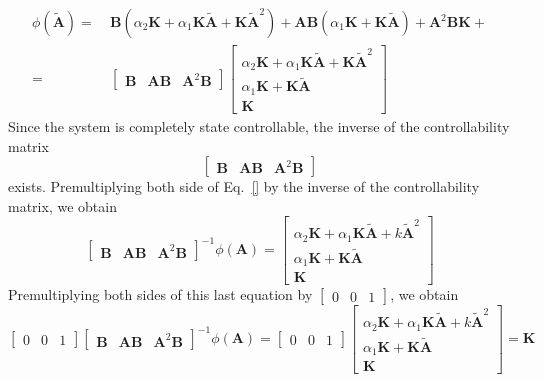 \documentclass[11pt,a4paper,oneside]{book}
\numberwithin{equation}{section}
\theoremstyle{it}
\theoremstyle{definition}
\begin{document}
\begin{equation} \label{ackermann_6}
	\begin{split}
		\phi(\tilde{\mathbf{A}}) = & \:\mathbf{B}(\alpha_2\mathbf{K}+\alpha_1\mathbf{K}\tilde{\mathbf{A}}+\mathbf{K}\tilde{\mathbf{A}}^2)+\mathbf{AB}(\alpha_1\mathbf{K}+\mathbf{K}\tilde{\mathbf{A}})+\mathbf{A}^2\mathbf{BK}+\\
		= & \: 	
		\begin{bmatrix}
			\mathbf{B} & \mathbf{AB} & \mathbf{A}^2\mathbf{B}
		\end{bmatrix}
		\begin{bmatrix}
			\alpha_2\mathbf{K}+\alpha_1\mathbf{K}\tilde{\mathbf{A}}+\mathbf{K}\tilde{\mathbf{A}}^2 \\ 
			\alpha_1\mathbf{K}+\mathbf{K}\tilde{\mathbf{A}} \\
			\mathbf{K}
		\end{bmatrix}
	\end{split}
\end{equation}
Since the system is completely state controllable, the inverse of the controllability matrix
\begin{equation}
	\begin{bmatrix}
		\mathbf{B} & \mathbf{AB} & \mathbf{A}^2\mathbf{B}
	\end{bmatrix}
\end{equation}
exists. Premultiplying both side of Eq.~\eqref{} by the inverse of the 
controllability matrix, we obtain
\begin{equation}
	\begin{bmatrix}
		\mathbf{B} & \mathbf{AB} & \mathbf{A}^2\mathbf{B}
	\end{bmatrix}^{-1} \phi(\mathbf{A})=
	\begin{bmatrix}
		\alpha_2\mathbf{K}+\alpha_1\mathbf{K}\tilde{\mathbf{A}}+k\tilde{\mathbf{A}}^2 \\ 
		\alpha_1\mathbf{K}+\mathbf{K}\tilde{\mathbf{A}} \\
		\mathbf{K}
	\end{bmatrix}
\end{equation}
Premultiplying both sides of this last equation by $\begin{bmatrix} 0&0&1\end{bmatrix}$, we obtain 
\begin{equation}
	\begin{bmatrix} 
		0&0&1
	\end{bmatrix}
	\begin{bmatrix}
		\mathbf{B} & \mathbf{AB} & \mathbf{A}^2\mathbf{B}
	\end{bmatrix}^{-1} \phi(\mathbf{A})=
	\begin{bmatrix} 
		0&0&1
	\end{bmatrix}
	\begin{bmatrix}
		\alpha_2\mathbf{K}+\alpha_1\mathbf{K}\tilde{\mathbf{A}}+k\tilde{\mathbf{A}}^2 \\ 
		\alpha_1\mathbf{K}+\mathbf{K}\tilde{\mathbf{A}} \\
		\mathbf{K}
	\end{bmatrix} = \mathbf{K}
\end{equation}
\end{document}
